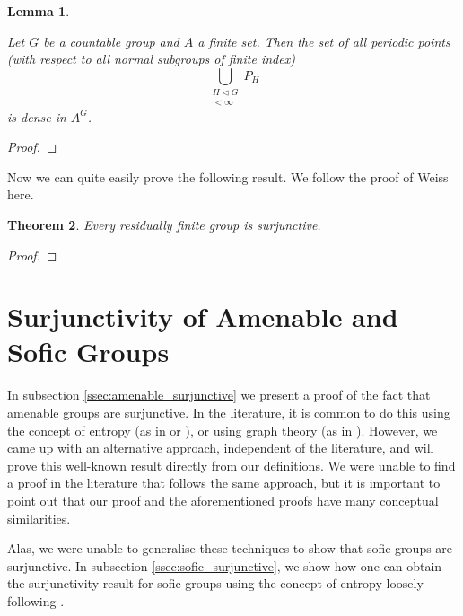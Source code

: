 \documentclass[titlepage, a4paper]{article}
\theoremstyle{theoremdd}
\newtheorem{theorem}{Theorem}[section]
\newtheorem{lemma}[theorem]{Lemma}
\theoremstyle{definitiondd}
\theoremstyle{remarkdd}
\begin{document}
\begin{lemma} \label{lem:h-periodic_points}
    
Let $G$ be a countable group and $A$ a finite set. Then the set of all periodic points (with respect to all normal subgroups of finite index)
    \[
    \bigcup_{\substack{ H \triangleleft G \\ [G : H] < \infty}} P_H
    \]
is dense in $A^G$.
\end{lemma}
\begin{proof}
% 

\end{proof}

Now we can quite easily prove the following result. We follow the proof of Weiss \cite[Theorem 1.3]{weiss_2000} here.
\begin{theorem} \label{thm:res_fin_surjunctive}
    Every residually finite group is surjunctive.
\end{theorem}
\begin{proof}
    
\end{proof}

	
\section{Surjunctivity of Amenable and Sofic Groups}

In subsection \ref{ssec:amenable_surjunctive} we present a proof of the fact that amenable groups are surjunctive. In the literature, it is common to do this using the concept of entropy (as in \cite[section 4]{kerr_li_2010} or \cite[subsection 2.13]{capraro_lupini_2015}), or using graph theory (as in \cite[section 3]{weiss_2000}). However, we came up with an alternative approach, independent of the literature, and will prove this well-known result directly from our definitions. We were unable to find a proof in the literature that follows the same approach, but it is important to point out that our proof and the aforementioned proofs have many conceptual similarities. 

Alas, we were unable to generalise these techniques to show that sofic groups are surjunctive. In subsection \ref{ssec:sofic_surjunctive}, we show how one can obtain the surjunctivity result for sofic groups using the concept of entropy loosely following \cite[paragraph 2.13.6 - 2.13.7]{capraro_lupini_2015}.
\end{document}

